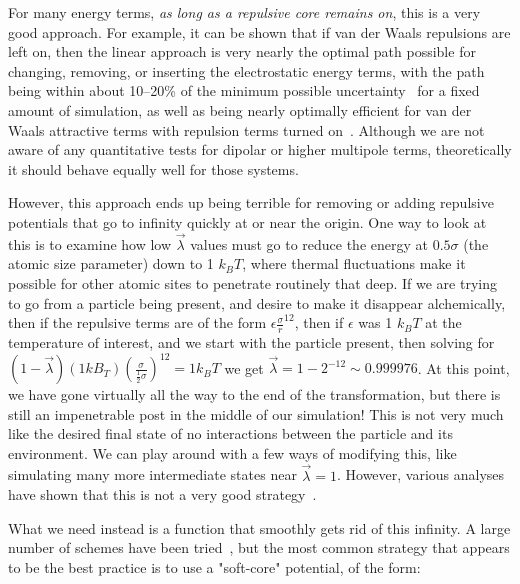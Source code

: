 \documentclass[9pt,bestpractices]{livecoms}
\begin{document}
For many energy terms, \textit{as long as a repulsive core remains on}, this is a very good approach. For example, it can be shown that if van der Waals repulsions are left on, then the linear approach is very nearly the optimal path possible for changing, removing, or inserting the electrostatic energy terms, with the path being within about 10--20\% of the minimum possible uncertainty~\cite{naden2015linear} for a fixed amount of simulation, as well as being nearly optimally efficient for van der Waals attractive terms with repulsion terms turned on~\cite{naden2014linear}. Although we are not aware of any quantitative tests for dipolar or higher multipole terms, theoretically it should behave equally well for those systems.

However, this approach ends up being terrible for removing or adding repulsive potentials that go to infinity quickly at or near the origin. One way to look at this is to examine how low $\vec{\lambda}$ values must go to reduce the energy at $0.5\sigma$ (the atomic size parameter) down to 1 $k_BT$, where thermal fluctuations make it possible for other atomic sites to penetrate routinely that deep. If we are trying to go from a particle being present, and desire to make it disappear alchemically, then if the repulsive terms are of the form $\epsilon\frac{\sigma}{r}^{12}$, then if $\epsilon$ was 1 $k_BT$ at the temperature of interest, and we start with the particle present, then solving for $(1-\vec{\lambda})(1 kB_T)\left(\frac{\sigma}{\frac{1}{2}\sigma}\right)^{12} = 1 k_B T$ we get $\vec{\lambda} = 1-2^{-12} \sim 0.999976$. At this point,  we have gone virtually all the way to the end of the transformation, but there is still an impenetrable post in the middle of our simulation! This is not very much like the desired final state of no interactions between the particle and its environment. We can play around with a few ways of modifying this, like simulating many more intermediate states near $\vec{\lambda}=1$. However, various analyses have shown that this is not a very good strategy~\cite{pham2011identifying, beutler1994avoiding, zacharias1994separationshifted, blondel2004ensemble, gapsys2012new}.

What we need instead is a function that smoothly gets rid of this infinity. A large number of schemes have been tried~\cite{beutler1994avoiding, zacharias1994separationshifted, blondel2004ensemble, pham2011identifying, pham2012optimal, naden2014linear, donnini2005molecular}, but the most common strategy that appears to be the best practice is to use a "soft-core" potential, of the form:
\end{document}

